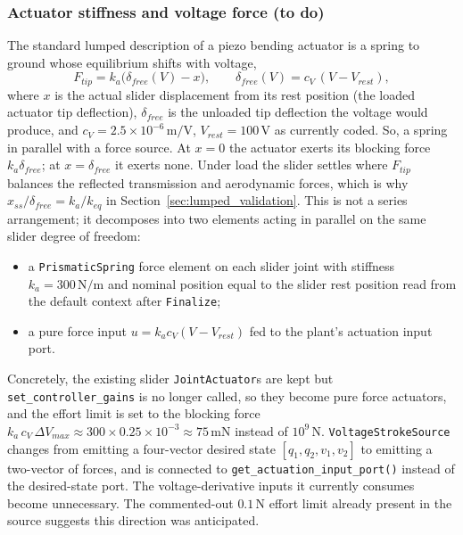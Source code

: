 \documentclass{article}
\begin{document}
\subsubsection{Actuator stiffness and voltage force (to do)}
The standard lumped description of a piezo bending actuator is a spring to ground whose equilibrium shifts with voltage,
\begin{equation}
    F_{tip} = k_a\bigl(\delta_{free}(V) - x\bigr), \qquad \delta_{free}(V) = c_V\,(V - V_{rest}),
\end{equation}
where \(x\) is the actual slider displacement from its rest position (the loaded actuator tip deflection), \(\delta_{free}\) is the unloaded tip deflection the voltage would produce, and \(c_V = 2.5\times 10^{-6}\,\mathrm{m/V}\), \(V_{rest} = 100\,\mathrm{V}\) as currently coded. So, a spring in parallel with a force source. At \(x = 0\) the actuator exerts its blocking force \(k_a\delta_{free}\); at \(x = \delta_{free}\) it exerts none. Under load the slider settles where \(F_{tip}\) balances the reflected transmission and aerodynamic forces, which is why \(x_{ss}/\delta_{free} = k_a/k_{eq}\) in Section~\ref{sec:lumped_validation}. This is not a series arrangement; it decomposes into two elements acting in parallel on the same slider degree of freedom:
\begin{itemize}
    \item a \texttt{PrismaticSpring} force element on each slider joint with stiffness \(k_a = 300\,\mathrm{N/m}\) and nominal position equal to the slider rest position read from the default context after \texttt{Finalize};
    \item a pure force input \(u = k_a c_V (V - V_{rest})\) fed to the plant's actuation input port.
\end{itemize}
Concretely, the existing slider \texttt{JointActuator}s are kept but \texttt{set\_controller\_gains} is no longer called, so they become pure force actuators, and the effort limit is set to the blocking force \(k_a\,c_V\,\Delta V_{max} \approx 300 \times 0.25\times 10^{-3} \approx 75\,\mathrm{mN}\) instead of \(10^9\,\mathrm{N}\). \texttt{VoltageStrokeSource} changes from emitting a four-vector desired state \([q_1, q_2, v_1, v_2]\) to emitting a two-vector of forces, and is connected to \texttt{get\_actuation\_input\_port()} instead of the desired-state port. The voltage-derivative inputs it currently consumes become unnecessary. The commented-out \(0.1\,\mathrm{N}\) effort limit already present in the source suggests this direction was anticipated.
\end{document}
